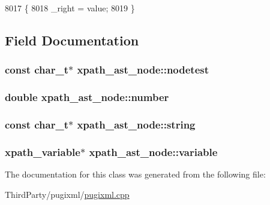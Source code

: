 \begin{DoxyCode}
8017         \{
8018             \_right = value;
8019         \}
\end{DoxyCode}


\subsection{Field Documentation}
\hypertarget{classxpath__ast__node_a50f44079b7f3e399e23488f520a34f17}{
\subsubsection[{nodetest}]{\setlength{\rightskip}{0pt plus 5cm}const char\-\_\-t$\ast$ xpath\-\_\-ast\-\_\-node\-::nodetest}}\label{classxpath__ast__node_a50f44079b7f3e399e23488f520a34f17}
\hypertarget{classxpath__ast__node_a73870c7a83538e525398855b26154484}{
\subsubsection[{number}]{\setlength{\rightskip}{0pt plus 5cm}double xpath\-\_\-ast\-\_\-node\-::number}}\label{classxpath__ast__node_a73870c7a83538e525398855b26154484}
\hypertarget{classxpath__ast__node_a187822d65799b3bbccd8d0522bd14e59}{
\subsubsection[{string}]{\setlength{\rightskip}{0pt plus 5cm}const char\-\_\-t$\ast$ xpath\-\_\-ast\-\_\-node\-::string}}\label{classxpath__ast__node_a187822d65799b3bbccd8d0522bd14e59}
\hypertarget{classxpath__ast__node_a0fd3b0d8f930836105eeff6e2efa5ad3}{
\subsubsection[{variable}]{\setlength{\rightskip}{0pt plus 5cm}xpath\-\_\-variable$\ast$ xpath\-\_\-ast\-\_\-node\-::variable}}\label{classxpath__ast__node_a0fd3b0d8f930836105eeff6e2efa5ad3}


The documentation for this class was generated from the following file\-:\begin{DoxyCompactItemize}
\item 
Third\-Party/pugixml/\hyperlink{pugixml_8cpp}{pugixml.\-cpp}\end{DoxyCompactItemize}
